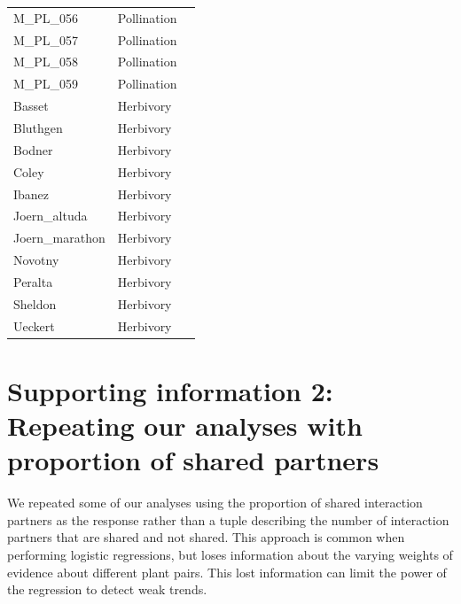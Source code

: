 \documentclass[12pt]{article}
\begin{document}
\begin{spacing}{1.5}
\begin{table}[h!]
\begin{center}
\begin{tabular}{|l l m{6cm} |}
    M\_PL\_056  & Pollination & \citep{Kato1993}  \\
    M\_PL\_057  & Pollination & \citep{Inoue1990} \\
    M\_PL\_058  & Pollination & \citep{Bartomeus2008} \\
    M\_PL\_059  & Pollination & \citep{Bezerra2009} \\
    Basset  & Herbivory & \citep{Basset1996}  \\
    Bluthgen  & Herbivory & \citep{Bluthgen2006}  \\
    Bodner  & Herbivory & \citep{Bodner2010}  \\
    Coley & Herbivory & \citep{Coley2006} \\
    Ibanez  & Herbivory & \citep{Ibanez2013}  \\
    Joern\_altuda  & Herbivory & \citep{Joern1979} \\
    Joern\_marathon  & Herbivory & \citep{Joern1979} \\
    Novotny & Herbivory & \citep{Novotny2012} \\
    Peralta & Herbivory & \citep{Peralta2016} \\
    Sheldon & Herbivory & \citep{Sheldon1978} \\
    Ueckert & Herbivory & \citep{Ueckert1971} \\
    \hline
    \end{tabular}
    \end{center}
    \end{table}
\clearpage
\newpage

\section*{Supporting information 2: Repeating our analyses with proportion of shared partners}

    We repeated some of our analyses using the proportion of shared interaction partners as the response rather than a tuple describing the number of interaction partners that are shared and not shared. This approach is common when performing logistic regressions, but loses information about the varying weights of evidence about different plant pairs. This lost information can limit the power of the regression to detect weak trends.



\end{spacing}
\end{document}

